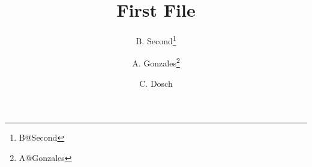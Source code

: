 \title{First File}
\author[2]{B. Second\thanks{B@Second}}
\author[1]{A. Gonzales\thanks{A@Gonzales}}
\author[1,2]{C. Dosch}


